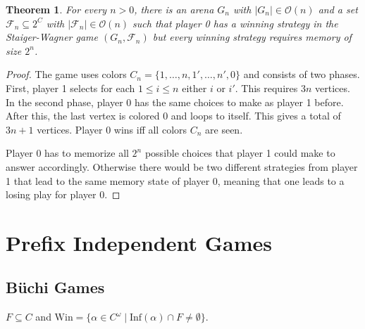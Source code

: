 \documentclass{article}
\newtheorem{theorem}{Theorem}
\begin{document}
\vspace{0.5cm}
\begin{theorem}
	For every $n > 0$, there is an arena $G_n$ with $|G_n| \in \mathcal{O}(n)$ and a set $\mathcal{F}_n \subseteq 2^C$ with $|\mathcal{F}_n| \in \mathcal{O}(n)$ such that player 0 has a winning strategy in the Staiger-Wagner game $(G_n, \mathcal{F}_n)$ but every winning strategy requires memory of size $2^n$.
\end{theorem}
\begin{proof}
	The game uses colors $C_n = \{1, \dots, n, 1', \dots, n', 0\}$ and consists of two phases. First, player 1 selects for each $1 \leq i \leq n$ either $i$ or $i'$. This requires $3n$ vertices. In the second phase, player 0 has the same choices to make as player 1 before. After this, the last vertex is colored $0$ and loops to itself. This gives a total of $3n+1$ vertices. Player 0 wins iff all colors $C_n$ are seen.
	
	Player 0 has to memorize all $2^n$ possible choices that player 1 could make to answer accordingly. Otherwise there would be two different strategies from player 1 that lead to the same memory state of player 0, meaning that one leads to a losing play for player 0.
\end{proof}

\vspace{1.5cm}
\section{Prefix Independent Games}
\subsection{Büchi Games}
$F \subseteq C$ and $\text{Win} = \{ \alpha \in C^\omega \mid \text{Inf}(\alpha) \cap F \neq \emptyset \}$.
\end{document}
